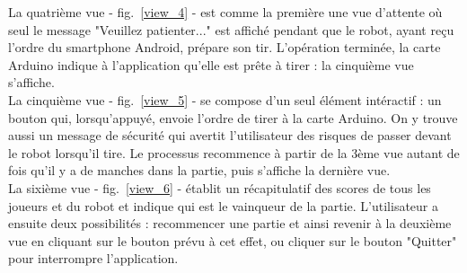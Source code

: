 La quatrième vue - fig.~\ref{view_4} - est comme la première une vue d’attente où seul le message "Veuillez patienter..." est affiché pendant que le robot, ayant reçu l’ordre du smartphone Android, prépare son tir. L’opération terminée, la carte Arduino indique à l’application qu’elle est prête à tirer : la cinquième vue s’affiche. \\
La cinquième vue - fig.~\ref{view_5} - se compose d’un seul élément intéractif : un bouton qui, lorsqu’appuyé, envoie l’ordre de tirer à la carte Arduino. On y trouve aussi un message de sécurité qui avertit l’utilisateur des risques de passer devant le robot lorsqu’il tire. Le processus recommence à partir de la 3ème vue autant de fois qu’il y a de manches dans la partie, puis s’affiche la dernière vue. \\
La sixième vue - fig.~\ref{view_6} - établit un récapitulatif des scores de tous les joueurs et du robot et indique qui est le vainqueur de la partie. L’utilisateur a ensuite deux possibilités : recommencer une partie et ainsi revenir à la deuxième vue en cliquant sur le bouton prévu à cet effet, ou cliquer sur le bouton "Quitter" pour interrompre l’application.


